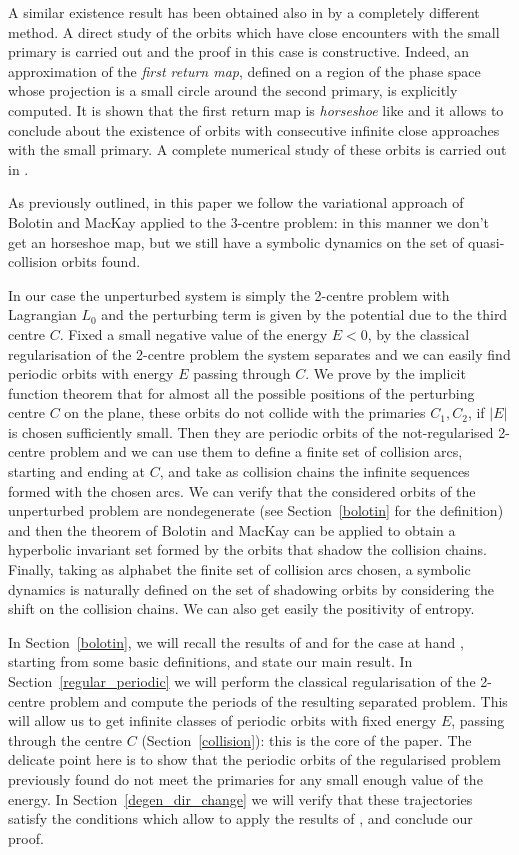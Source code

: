 \documentclass[a4paper]{article}
\begin{document}
A similar existence result has been obtained also in \cite{FNS1} by a
completely different method. A direct study of the orbits which have
close encounters with the small primary is carried out and the proof
in this case is constructive. Indeed, an approximation of the
\emph{first return map}, defined on a region of the phase space whose
projection is a small circle around the second primary, is explicitly
computed.  It is shown that the first return map is \emph{horseshoe}
like and it allows to conclude about the existence of orbits with
consecutive infinite close approaches with the small primary.  A
complete numerical study of these orbits is carried out in
\cite{FNS2}.

As previously outlined, in this paper we follow the variational
approach of Bolotin and MacKay applied to the 3-centre problem: in
this manner we don't get an horseshoe map, but we still have a
symbolic dynamics on the set of quasi-collision orbits found.

In our case the unperturbed system is simply the 2-centre problem with
Lagrangian $L_0$ and the perturbing term is given by the potential due
to the third centre $C$. Fixed a small negative value of the energy
$E<0$, by the classical regularisation of the 2-centre problem the
system separates and we can easily find periodic orbits with energy
$E$ passing through $C$. We prove by the implicit function theorem
that for almost all the possible positions of the perturbing centre
$C$ on the plane, these orbits do not collide with the primaries
$C_1,C_2$, if $|E|$ is chosen sufficiently small.  Then they are
periodic orbits of the not-regularised 2-centre problem and we can use
them to define a finite set of collision arcs, starting and ending at
$C$, and take as collision chains the infinite sequences formed with
the chosen arcs.  We can verify that the considered orbits of the
unperturbed problem are nondegenerate (see Section~\ref{bolotin} for
the definition) and then the theorem of Bolotin and MacKay can be
applied to obtain a hyperbolic invariant set formed by the orbits that
shadow the collision chains.
Finally, taking as alphabet the finite set of collision arcs chosen, a
symbolic dynamics is naturally defined on the set of shadowing orbits
by considering the shift on the collision chains.  We can also get
easily the positivity of entropy.
 
In Section~\ref{bolotin}, we will recall the results of \cite{BM1} and
\cite{BM2} for the case at hand , starting from some basic
definitions, and state our main result.  In
Section~\ref{regular_periodic} we will perform the classical
regularisation of the 2-centre problem and compute the periods of the
resulting separated problem. This will allow us to get infinite
classes of periodic orbits with fixed energy $E$, passing through the
centre $C$ (Section~\ref{collision}): this is the core of the
paper. The delicate point here is to show that the periodic orbits of
the regularised problem previously found do not meet the primaries for
any small enough value of the energy.  In
Section~\ref{degen_dir_change} we will verify that these trajectories
satisfy the conditions which allow to apply the results of \cite{BM1},
\cite{BM2} and conclude our proof.
\end{document}
